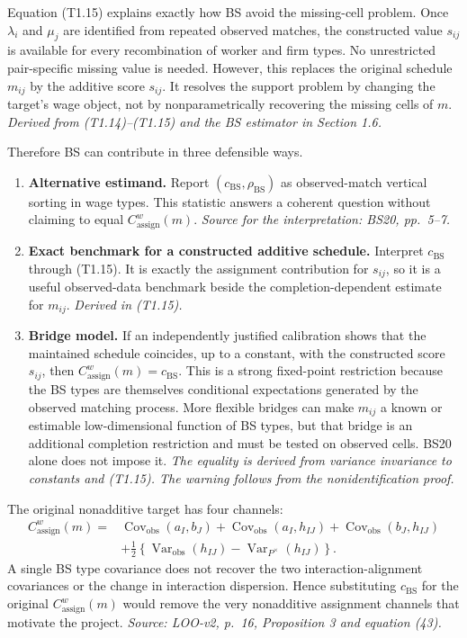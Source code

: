 \documentclass[11pt]{article}
\begin{document}
Equation (T1.15) explains exactly how BS avoid the missing-cell problem.  Once
\(\lambda_i\) and \(\mu_j\) are identified from repeated observed matches, the
constructed value \(s_{ij}\) is available for every recombination of worker
and firm types.  No unrestricted pair-specific missing value is needed.
However, this replaces the original schedule \(m_{ij}\) by the additive score
\(s_{ij}\).  It resolves the support problem by changing the target's wage
object, not by nonparametrically recovering the missing cells of \(m\).
\textit{Derived from (T1.14)--(T1.15) and the BS estimator in
Section 1.6.}

Therefore BS can contribute in three defensible ways.

\begin{enumerate}
\item \textbf{Alternative estimand.} Report
  \((c_{\mathrm{BS}},\rho_{\mathrm{BS}})\) as observed-match vertical sorting
  in wage types.  This statistic answers a coherent question without claiming
  to equal \(C^w_{\mathrm{assign}}(m)\).
  \textit{Source for the interpretation: BS20, pp.\ 5--7.}
\item \textbf{Exact benchmark for a constructed additive schedule.} Interpret
  \(c_{\mathrm{BS}}\) through (T1.15).  It is exactly the assignment
  contribution for \(s_{ij}\), so it is a useful observed-data benchmark
  beside the completion-dependent estimate for \(m_{ij}\).
  \textit{Derived in (T1.15).}
\item \textbf{Bridge model.} If an independently justified calibration shows
  that the maintained schedule coincides, up to a constant, with the
  constructed score \(s_{ij}\), then
  \(C^w_{\mathrm{assign}}(m)=c_{\mathrm{BS}}\).  This is a strong fixed-point
  restriction because the BS types are themselves conditional expectations
  generated by the observed matching process.  More flexible bridges can
  make \(m_{ij}\) a known or estimable low-dimensional function of BS types,
  but that bridge is an additional completion restriction and must be tested
  on observed cells.  BS20 alone does not impose it.
  \textit{The equality is derived from variance invariance to constants and
  (T1.15).  The warning follows from the nonidentification proof.}
\end{enumerate}

The original nonadditive target has four channels:
\[
\begin{aligned}
C^w_{\mathrm{assign}}(m)
={}&\operatorname{Cov}_{\mathrm{obs}}(a_I,b_J)
+\operatorname{Cov}_{\mathrm{obs}}(a_I,h_{IJ})
+\operatorname{Cov}_{\mathrm{obs}}(b_J,h_{IJ})\\
&+\frac12\left\{
\operatorname{Var}_{\mathrm{obs}}(h_{IJ})
-\operatorname{Var}_{P^\times}(h_{IJ})
\right\}.
\end{aligned}
\tag{T1.16}
\]
A single BS type covariance does not recover the two interaction-alignment
covariances or the change in interaction dispersion.  Hence substituting
\(c_{\mathrm{BS}}\) for the original \(C^w_{\mathrm{assign}}(m)\) would remove
the very nonadditive assignment channels that motivate the project.
\textit{Source: LOO-v2, p.\ 16, Proposition 3 and equation (43).}
\end{document}
